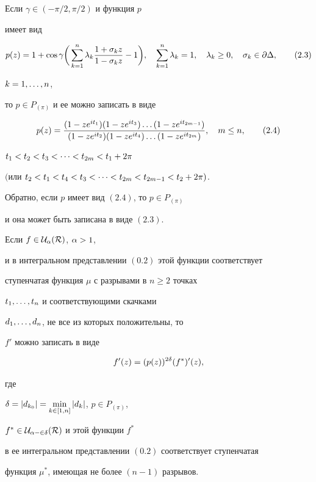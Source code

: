 \begin{lem}


Если $\gamma \in(-\pi/2,\pi/2)$ и функция $p$


имеет вид


\begin{equation}


p(z)=1+\cos\gamma\bigg(\sum_{k=1}^n\la_k\frac{1+\sigma_kz}{1-\sigma_


kz}-1\bigg), \quad \sum_{k=1}^n\la_k =1, \quad \la_k\ge 0, \quad


\sigma_k\in\partial\De, \tag{2.3}


\end{equation}


$k=1,\dotsc, n$,


то $p\in P_{(\pi)}$ и ее можно записать в виде


\begin{equation}


p(z)=\frac{(1-ze^{it_1})(1-ze^{it_3})\ld(1-ze^{it_{2m-1}})}


{(1-ze^{it_2})(1-ze^{it_4})\ld(1-ze^{it_{2m}})}, \quad m\le n, \tag{2.4}


\end{equation}


$t_1<t_2<t_3<\dotsb< t_{2m}<t_1+2\pi$ 


$($или $t_2<t_1<t_4<t_3<\dotsb< t_{2m}<t_{2m-1}<t_2+2\pi)$.


Обратно, если $p$ имеет вид $(2.4)$, то $p\in P_{(\pi)}$


и она может быть записана в виде $(2.3)$.


\end{lem}





\begin{lem}


Если $f \in \cal U_{\alpha}(R)$, $\alpha > 1$,


и в интегральном представлении $(0.2)$ этой функции соответствует


ступенчатая функция $\mu$ с разрывами в $n\ge 2$ точках


$t_1, \dotsc , t_n$ и соответствующими скачками


$d_1, \dotsc ,d_n$, не все из которых положительны, то


$f'$ можно записать в виде


$$


f'(z)=(p(z))^{2\de}(f^*)'(z),


$$


где


$\delta=|d_{k_0}|=\min\limits_{k \in [1,n]}|d_k|$, $ p\in P_{(\pi)}$,


$f^* \in \cal U_{\alpha-2\delta}(R)$ и этой функции $f^*$


в ее интегральном представлении $(0.2)$ соответствует ступенчатая


функция $\mu^*$, имеющая не более $(n-1)$ разрывов.


\end{lem}





